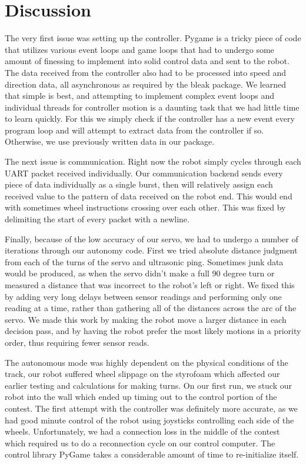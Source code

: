 \documentclass[letterpaper,11pt]{texMemo} %
\begin{document}
\section*{Discussion}
The very first issue was setting up the controller. Pygame is a tricky piece of code 
that utilizes various event loops and game loops that had to undergo some amount 
of finessing to implement into solid control data and sent to the robot. The data 
received from the controller also had to be processed into speed and direction data, 
all asynchronous as required by the bleak package. We learned that simple is best, 
and attempting to implement complex event loops and individual threads for controller 
motion is a daunting task that we had little time to learn quickly. For this we 
simply check if the controller has a new event every program loop and will attempt 
to extract data from the controller if so. Otherwise, we use previously written data 
in our package.

The next issue is communication. Right now the robot simply cycles through each UART
packet received individually. Our communication backend sends every piece of data 
individually as a single burst, then will relatively assign each received value to 
the pattern of data received on the robot end. This would end with sometimes 
wheel instructions crossing over each other. This was fixed by delimiting the start of every packet with a newline.

Finally, because of the low accuracy of our servo, we had to undergo a number of iterations 
through our autonomy code. First we tried absolute distance judgment from each of the turns 
of the servo and ultrasonic ping. Sometimes junk data would be produced, as when the servo 
didn't make a full 90 degree turn or measured a distance that was incorrect 
to the robot's left or right. We fixed this by adding very long delays between sensor readings and performing only one reading at a time, rather than gathering all of the distances across the arc of the servo. We made this work by making the robot move a larger distance in each decision pass, and by having the robot prefer the most likely motions in a priority order, thus requiring fewer sensor reads.

The autonomous mode was highly dependent on the physical conditions of the track, our robot suffered 
wheel slippage on the styrofoam which affected our earlier testing and calculations for making turns. 
On our first run, we stuck our robot into the wall which ended up timing out to the control portion 
of the contest. The first attempt with the controller was definitely more accurate, as we had good 
minute control of the robot using joysticks controlling each side of the wheels. Unfortunately, 
we had a connection loss in the middle of the contest which required us to do a reconnection cycle 
on our control computer. The control library PyGame takes a considerable amount of time to re-initialize
itself.
\end{document}
